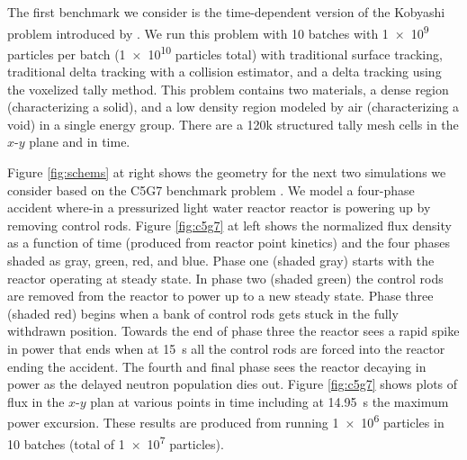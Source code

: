 The first benchmark we consider is the time-dependent version of the Kobyashi problem \cite{Kobayashi2001} introduced by \cite{morgan_2025_monte}.
We run this problem with 10 batches with \num{1e9} particles per batch (\num{1e10} particles total) with traditional surface tracking, traditional delta tracking with a collision estimator, and a delta tracking using the voxelized tally method.
This problem contains two materials, a dense region (characterizing a solid), and a low density region modeled by air (characterizing a void) in a single energy group.
There are a 120k structured tally mesh cells in the $x$-$y$ plane and in time.

Figure \ref{fig:schems} at right shows the geometry for the next two simulations we consider based on the C5G7 benchmark problem \cite{jia_hou_oecdnea_2017}.
We model a four-phase accident where-in a pressurized light water reactor reactor is powering up by removing control rods.
Figure \ref{fig:c5g7} at left shows the normalized flux density as a function of time (produced from reactor point kinetics) and the four phases shaded as gray, green, red, and blue.
Phase one (shaded gray) starts with the reactor operating at steady state.
In phase two (shaded green) the control rods are removed from the reactor to power up to a new steady state.
Phase three (shaded red) begins when a bank of control rods gets stuck in the fully withdrawn position.
Towards the end of phase three the reactor sees a rapid spike in power that ends when at \SI{15}{\s} all the control rods are forced into the reactor ending the accident.
The fourth and final phase sees the reactor decaying in power as the delayed neutron population dies out.
Figure \ref{fig:c5g7} shows plots of flux in the $x$-$y$ plan at various points in time including at \SI{14.95}{\s} the maximum power excursion.
These results are produced from running \num{1e6} particles in \num{10} batches (total of \num{1e7} particles).


